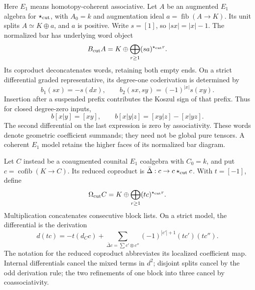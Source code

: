 Here $E_1$ means homotopy-coherent associative. Let $A$ be an augmented
$E_1$ algebra for $\star_{\mathrm{cut}}$, with $A_0=k$ and
augmentation ideal $a=\operatorname{fib}(A\to K)$. Its unit splits
$A\simeq K\oplus a$, and $a$ is positive. Write $s=[1]$, so
$|sx|=|x|-1$. The normalized bar has underlying word object
\begin{equation}\label{cycuts:eq:bar}
 B_{\mathrm{cut}} A=K\oplus\bigoplus_{r\ge1}(sa)^{\star_{\mathrm{cut}} r}.
\end{equation}
Its coproduct deconcatenates words, retaining both empty ends. On a
strict differential graded representative, its degree-one coderivation
is determined by
\begin{equation}\label{cycuts:eq:bar-signs}
 b_1(sx)=-s(dx),\qquad b_2(sx,sy)=(-1)^{|x|}s(xy).
\end{equation}
Insertion after a suspended prefix contributes the Koszul sign of that
prefix. Thus for closed degree-zero inputs,
\[
 b[x|y]=[xy],\qquad
 b[x|y|z]=[xy|z]-[x|yz].
\]
The second differential on the last expression is zero by associativity.
These words denote geometric coefficient summands; they need not be
global pure tensors. A coherent $E_1$ model retains the higher faces
of its normalized bar diagram.

Let $C$ instead be a coaugmented counital $E_1$ coalgebra with $C_0=k$,
and put $c=\operatorname{cofib}(K\to C)$. Its reduced coproduct is
$\bar\Delta:c\to c\star_{\mathrm{cut}} c$. With $t=[-1]$, define
\begin{equation}\label{cycuts:eq:cobar}
 \Omega_{\mathrm{cut}} C=K\oplus\bigoplus_{r\ge1}(tc)^{\star_{\mathrm{cut}} r}.
\end{equation}
Multiplication concatenates consecutive block lists. On a strict model,
the differential is the derivation
\begin{equation}\label{cycuts:eq:cobar-signs}
 d(tc)=-t(d_Cc)+
 \sum_{\bar\Delta c=\sum c'\otimes c''}
             (-1)^{|c'|+1}(tc')(tc'').
\end{equation}
The notation for the reduced coproduct abbreviates its localized
coefficient map. Internal differentials cancel the mixed terms in
$d^2$; disjoint splits cancel by the odd derivation rule; the two
refinements of one block into three cancel by coassociativity.

